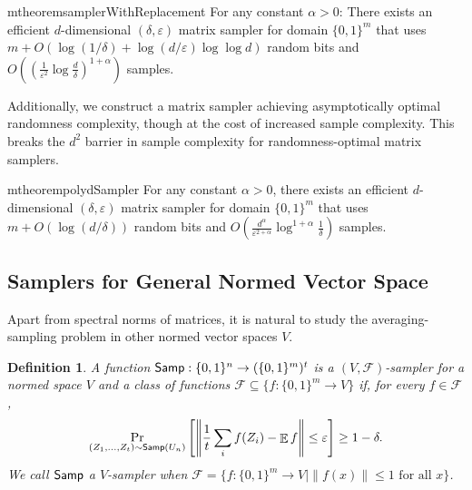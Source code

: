\documentclass[11pt,letterpaper]{article}
\newtheorem{definition}[theorem]{Definition}
\newcommand{\C}{\mathbb{C}}
\DeclareMathOperator*{\E}{\mathbb{E}}
\newcommand{\eps}{\varepsilon}
\newcommand{\1}{\mathbbm{1}}
\newcommand{\norm}[1]{\left\lVert #1\right\rVert}
\newcommand{\zo}{\{0, 1\}}
\newcommand{\Smp}{\textup{\textsf{Samp}}}
\begin{document}
\begin{restatable}{mtheorem}{samplerWithReplacement}
 \label{thm:sampler_with_replacement}
    For any constant $\alpha > 0$:
    There exists an efficient $d$-dimensional $(\delta, \eps)$ matrix sampler for domain $\zo^m$ that uses $m + O(\log(1 / \delta) + \log(d / \eps) \log\log d)$ random bits and $O((\frac{1}{\eps^2}\log\frac{d}{\delta})^{1 + \alpha})$ samples.   
\end{restatable}

Additionally, we construct a matrix sampler achieving asymptotically optimal randomness complexity, though at the cost of increased sample complexity. This breaks the $d^2$ barrier in sample complexity for randomness-optimal matrix samplers.

\begin{restatable}{mtheorem}{polydSampler}
    \label{thm:polydSampler}
        For any constant $\alpha > 0$,  there exists an efficient $d$-dimensional $(\delta, \eps)$ matrix sampler for domain $\zo^m$ that uses $m + O(\log (d / \delta))$ random bits and $O(\frac{d^\alpha}{\eps^{2+\alpha}}\log^{1+\alpha}\frac{1}{\delta})$ samples.
\end{restatable}

\subsection{Samplers for General Normed Vector Space}
Apart from spectral norms of matrices, it is natural to study the averaging-sampling problem in other normed vector spaces \(V\).


\begin{definition}
    A function \(\Smp : \zo^n \to (\zo^m)^t\) is a \((V,\mathcal{F})\)-sampler for a normed space \(V\) and a class of functions \(\mathcal{F} \subseteq \{f:\zo^m \to V\}\) if, for every \(f \in \mathcal{F}\),
    \[
    \Pr_{(Z_1, \dots, Z_t) \sim \Smp(U_n)}
    \left[ \norm{\frac{1}{t}  \sum_i f(Z_i) - \E f} \leq \varepsilon \right]
    \geq 1 - \delta.
    \]
    We call \(\Smp\) a \(V\)-sampler when \(\mathcal{F} = \{f:\zo^m \to V \mid \|f(x)\|\le 1 \text{ for all } x\}\).
\end{definition}

\end{document}
